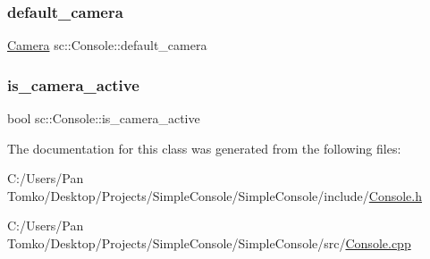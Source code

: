 \mbox{\label{classsc_1_1_console_ae0ab85054dd025a0a29f141e0fa06ce7}} 
\subsubsection{\texorpdfstring{default\_camera}{default\_camera}}
{\footnotesize\ttfamily \mbox{\hyperlink{classsc_1_1_camera}{Camera}} sc\+::\+Console\+::default\+\_\+camera}

\mbox{\label{classsc_1_1_console_a439fd7c948b530f8688ab4db0bfa82fc}} 
\subsubsection{\texorpdfstring{is\_camera\_active}{is\_camera\_active}}
{\footnotesize\ttfamily bool sc\+::\+Console\+::is\+\_\+camera\+\_\+active}



The documentation for this class was generated from the following files\+:\begin{DoxyCompactItemize}
\item 
C\+:/\+Users/\+Pan Tomko/\+Desktop/\+Projects/\+Simple\+Console/\+Simple\+Console/include/\mbox{\hyperlink{_console_8h}{Console.\+h}}\item 
C\+:/\+Users/\+Pan Tomko/\+Desktop/\+Projects/\+Simple\+Console/\+Simple\+Console/src/\mbox{\hyperlink{_console_8cpp}{Console.\+cpp}}\end{DoxyCompactItemize}
